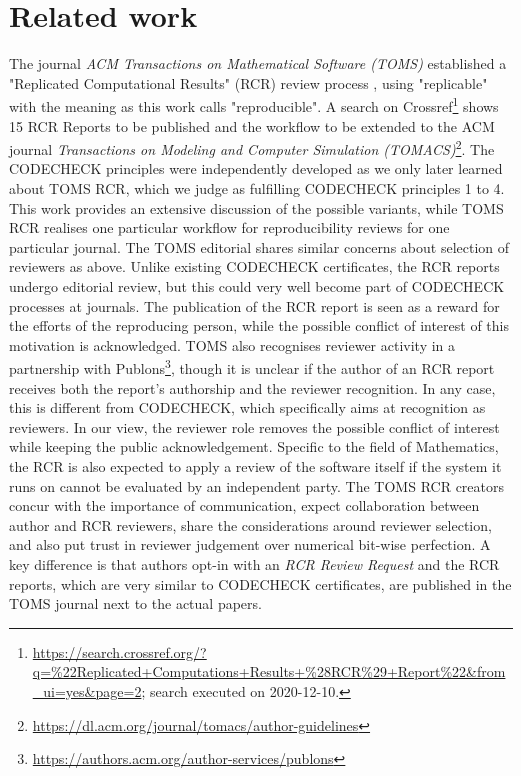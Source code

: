 \documentclass[12pt]{article}
\begin{document}
\section*{Related work}\label{related-work}

The journal \emph{ACM Transactions on Mathematical Software (TOMS)} 
established a "Replicated Computational Results" (RCR) review process
\cite{heroux_editorial_2015}, using "replicable" with the meaning 
as this work calls "reproducible".
A search on Crossref\footnote{\url{https://search.crossref.org/?q=\%22Replicated+Computations+Results+\%28RCR\%29+Report\%22&from_ui=yes&page=2}; search executed
on 2020-12-10.} shows 15 RCR Reports to be published and the 
workflow to be 
extended to the ACM journal \emph{Transactions on Modeling and Computer 
Simulation (TOMACS)}\footnote{\url{https://dl.acm.org/journal/tomacs/author-guidelines}}.
The CODECHECK principles were independently developed as we only later 
learned about TOMS RCR, which we judge as fulfilling CODECHECK principles
1 to 4.
This work provides an extensive discussion of the possible variants, 
while TOMS RCR realises one particular workflow for reproducibility 
reviews for one particular journal. The TOMS editorial
\cite{heroux_editorial_2015} shares similar concerns about
selection of reviewers as above. Unlike existing CODECHECK certificates, 
the RCR reports undergo editorial review, but this could very well become
part of CODECHECK processes at journals.
The publication of the RCR report is seen as a reward for the efforts of
the reproducing person, while the possible conflict of interest of this 
motivation is acknowledged. TOMS also recognises reviewer activity in a 
partnership with Publons\footnote{
\url{https://authors.acm.org/author-services/publons}},
though it is unclear if the author of an RCR report receives both the report's
authorship and the reviewer recognition. In any case, this is different
from CODECHECK, which specifically aims at recognition as reviewers.
In our view, the reviewer role removes the possible conflict of interest while
keeping the public acknowledgement.
Specific to the field of Mathematics, the RCR is also expected to apply a
review of the software itself if the system it runs on cannot be evaluated by
an independent party.
The TOMS RCR creators concur with the importance of communication, expect
collaboration between author and RCR reviewers,
share the considerations around reviewer selection, and also put trust
in reviewer judgement over numerical bit-wise perfection.
A key difference is that authors opt-in with an \emph{RCR Review Request} and
the RCR reports, which are very similar to CODECHECK certificates, are
published in the TOMS journal next to the actual papers.
\end{document}
